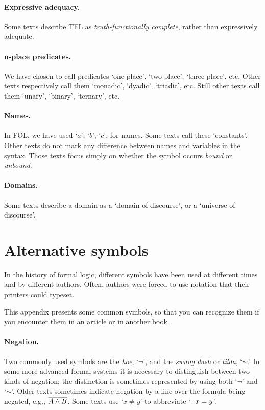 \paragraph{Expressive adequacy.} Some texts describe TFL as \emph{truth-functionally complete}, rather than expressively adequate.

\paragraph{n-place predicates.} We have chosen to call predicates `one-place', `two-place', `three-place', etc. Other texts respectively call them `monadic', `dyadic', `triadic', etc. Still other texts call them `unary', `binary', `ternary', etc.

\paragraph{Names.} In FOL, we have used `$a$', `$b$', `$c$', for names. Some texts call these `constants'. Other texts do not mark any difference between names and variables in the syntax. Those texts focus simply on  whether the symbol occurs \emph{bound} or \emph{unbound}. 

\paragraph{Domains.} Some texts describe a domain as a `domain of discourse', or a `universe of discourse'.

\section{Alternative symbols}
In the history of formal logic, different symbols have been used at different times and by different authors. Often, authors were forced to use notation that their printers could typeset.

This appendix presents some common symbols, so that you can recognize them if you encounter them in an article or in another book.

\paragraph{Negation.} Two commonly used symbols are the \emph{hoe}, `$\neg$', and the \emph{swung dash} or \emph{tilda}, `${\sim}$.' In some more advanced formal systems it is necessary to distinguish between two kinds of negation; the distinction is sometimes represented by using both `$\neg$' and `${\sim}$'. Older texts sometimes indicate negation by a line over the formula being negated, e.g., $\overline{A \wedge B}$. Some texts use `$x \neq y$' to abbreviate `$\neg x = y$'.

